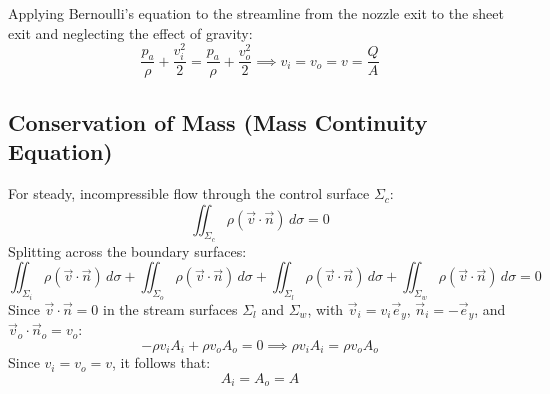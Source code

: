 \documentclass[11pt,a4paper]{article}
\numberwithin{equation}{section}
\begin{document}
 Applying Bernoulli's equation to the streamline from the nozzle exit to the sheet exit and neglecting the effect of gravity:
\begin{equation}
    \frac{p_a}{\rho} + \frac{v_i^2}{2} = \frac{p_a}{\rho} + \frac{v_o^2}{2} \implies v_i = v_o = v = \frac{Q}{A}
\end{equation}

\subsection{Conservation of Mass (Mass Continuity Equation)}
For steady, incompressible flow through the control surface $\Sigma_c$:
\begin{equation}
    \iint_{\Sigma_c} \rho (\vec{v} \cdot \vec{n}) \, d\sigma = 0
\end{equation}
Splitting across the boundary surfaces:
\begin{equation}
    \iint_{\Sigma_i} \rho (\vec{v} \cdot \vec{n}) \, d\sigma + \iint_{\Sigma_o} \rho (\vec{v} \cdot \vec{n}) \, d\sigma + \iint_{\Sigma_l} \rho (\vec{v} \cdot \vec{n}) \, d\sigma + \iint_{\Sigma_w} \rho (\vec{v} \cdot \vec{n}) \, d\sigma = 0
\end{equation}
Since $\vec{v} \cdot \vec{n} = 0$ in the stream surfaces $\Sigma_l$ and $\Sigma_w$, with $\vec{v}_i = v_i \vec{e}_y$, $\vec{n}_i = -\vec{e}_y$, and $\vec{v}_o \cdot \vec{n}_o = v_o$:
\begin{equation}
    -\rho v_i A_i + \rho v_o A_o = 0 \implies \rho v_i A_i = \rho v_o A_o
\end{equation}
Since $v_i = v_o = v$, it follows that:
\begin{equation}
    A_i = A_o = A
\end{equation}
\end{document}
